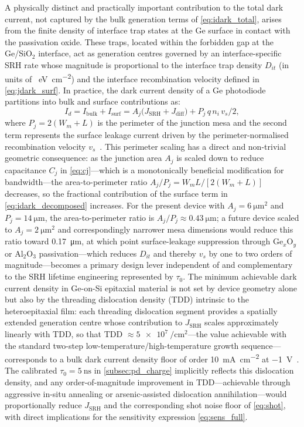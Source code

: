 A physically distinct and practically important contribution to the total dark
current, not captured by the bulk generation terms of \cref{eq:idark_total},
arises from the finite density of interface trap states at the Ge surface in
contact with the passivation oxide. These traps, located within the forbidden
gap at the Ge/SiO$_2$ interface, act as generation centres governed by an
interface-specific SRH rate whose magnitude is proportional to the interface
trap density $D_{it}$ (in units of \si{\per\electronvolt\per\centi\metre\squared})
and the interface recombination velocity defined in \cref{eq:jdark_surf}. In
practice, the dark current density of a Ge photodiode partitions into bulk and
surface contributions as:
\begin{equation}
    I_d = I_{\mathrm{bulk}} + I_{\mathrm{surf}}
    = A_j \bigl(J_{\mathrm{SRH}} + J_{\mathrm{diff}}\bigr)
    + P_j\,q\,n_i\,v_s/2,
    \label{eq:idark_decomposed}
\end{equation}
where $P_j = 2(W_m + L)$ is the perimeter of the junction mesa and the second
term represents the surface leakage current driven by the perimeter-normalised
recombination velocity $v_s$~\cite{Yan2024}. This perimeter scaling has a
direct and non-trivial geometric consequence: as the junction area $A_j$ is
scaled down to reduce capacitance $C_j$ in \cref{eq:cj}—which is a
monotonically beneficial modification for bandwidth—the area-to-perimeter ratio
$A_j/P_j = W_m L/[2(W_m + L)]$ decreases, so the fractional contribution of
the surface term in \cref{eq:idark_decomposed} increases. For the present
device with $A_j = \SI{6}{\micro\metre\squared}$ and $P_j = \SI{14}{\micro\metre}$,
the area-to-perimeter ratio is $A_j/P_j \approx \SI{0.43}{\micro\metre}$; a
future device scaled to $A_j = \SI{2}{\micro\metre\squared}$ and correspondingly
narrower mesa dimensions would reduce this ratio toward \SI{0.17}{\micro\metre},
at which point surface-leakage suppression through Ge$_x$O$_y$ or Al$_2$O$_3$
passivation—which reduces $D_{it}$ and thereby $v_s$ by one to two orders of
magnitude—becomes a primary design lever independent of and complementary to
the SRH lifetime engineering represented by $\tau_0$. The minimum achievable
dark current density in Ge-on-Si epitaxial material is not set by device
geometry alone but also by the threading dislocation density (TDD) intrinsic
to the heteroepitaxial film: each threading dislocation segment provides a
spatially extended generation centre whose contribution to $J_{\mathrm{SRH}}$
scales approximately linearly with TDD, so that TDD $\approx \SI{5e7}{\per
\centi\metre\squared}$—the value achievable with the standard two-step
low-temperature/high-temperature growth sequence—corresponds to a bulk dark
current density floor of order \SI{10}{\milli\ampere\per\centi\metre\squared}
at \SI{-1}{\volt}~\cite{Yan2024}. The calibrated $\tau_0 = \SI{5}{\nano\second}$
in \cref{subsec:pd_charge} implicitly reflects this dislocation density, and
any order-of-magnitude improvement in TDD—achievable through aggressive in-situ
annealing or arsenic-assisted dislocation annihilation—would proportionally
reduce $J_{\mathrm{SRH}}$ and the corresponding shot noise floor of
\cref{eq:shot}, with direct implications for the sensitivity expression
\cref{eq:sens_full}.


